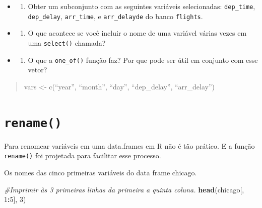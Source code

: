 \documentclass[]{book}
\newenvironment{Shaded}{\begin{snugshade}}{\end{snugshade}}
\newcommand{\CommentTok}[1]{\textcolor[rgb]{0.56,0.35,0.01}{\textit{#1}}}
\newcommand{\DecValTok}[1]{\textcolor[rgb]{0.00,0.00,0.81}{#1}}
\newcommand{\KeywordTok}[1]{\textcolor[rgb]{0.13,0.29,0.53}{\textbf{#1}}}
\newcommand{\NormalTok}[1]{#1}
\newcommand{\OperatorTok}[1]{\textcolor[rgb]{0.81,0.36,0.00}{\textbf{#1}}}
\providecommand{\tightlist}{%
  \setlength{\itemsep}{0pt}\setlength{\parskip}{0pt}}
\begin{document}
\begin{itemize}
\item
  \begin{enumerate}
  \def\labelenumi{\arabic{enumi}.}
  \tightlist
  \item
    Obter um subconjunto com as seguintes variáveis selecionadas: \texttt{dep\_time}, \texttt{dep\_delay}, \texttt{arr\_time}, e \texttt{arr\_delayde} do banco \texttt{flights}.
  \end{enumerate}
\item
  \begin{enumerate}
  \def\labelenumi{\arabic{enumi}.}
  \setcounter{enumi}{1}
  \tightlist
  \item
    O que acontece se você incluir o nome de uma variável várias vezes em uma \texttt{select()} chamada?
  \end{enumerate}
\item
  \begin{enumerate}
  \def\labelenumi{\arabic{enumi}.}
  \setcounter{enumi}{2}
  \tightlist
  \item
    O que a \texttt{one\_of()} função faz? Por que pode ser útil em conjunto com esse vetor?
  \end{enumerate}
\end{itemize}

\begin{quote}
vars \textless- c(``year'', ``month'', ``day'', ``dep\_delay'', ``arr\_delay'')
\end{quote}

\hypertarget{rename}{%
\section{\texorpdfstring{\texttt{rename()}}{rename()}}\label{rename}}

Para renomear variáveis em uma data.frames em R não é tão prático. E a função \texttt{rename()} foi projetada para facilitar esse processo.

Os nomes das cinco primeiras variáveis do data frame chicago.

\begin{Shaded}
\begin{Highlighting}[]
\CommentTok{#Imprimir às 3 primeiras linhas da primeira a quinta coluna.}
\KeywordTok{head}\NormalTok{(chicago[, }\DecValTok{1}\OperatorTok{:}\DecValTok{5}\NormalTok{], }\DecValTok{3}\NormalTok{)}
\end{Highlighting}
\end{Shaded}
\end{document}
